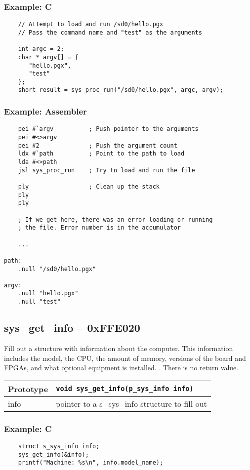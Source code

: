 \subsubsection*{Example: C}
\begin{lstlisting}
    // Attempt to load and run /sd0/hello.pgx
    // Pass the command name and "test" as the arguments

    int argc = 2;
    char * argv[] = {
       "hello.pgx",
       "test"
    };
    short result = sys_proc_run("/sd0/hello.pgx", argc, argv);
\end{lstlisting}

\subsubsection*{Example: Assembler}
\begin{verbatim}
    pei #`argv          ; Push pointer to the arguments
    pei #<>argv
    pei #2              ; Push the argument count
    ldx #`path          ; Point to the path to load
    lda #<>path
    jsl sys_proc_run    ; Try to load and run the file

    ply                 ; Clean up the stack
    ply
    ply

    ; If we get here, there was an error loading or running
    ; the file. Error number is in the accumulator

    ...

path:
    .null "/sd0/hello.pgx"

argv:
    .null "hello.pgx"
    .null "test"
\end{verbatim}


\subsection*{sys\_get\_info -- 0xFFE020}
Fill out a structure with information about the computer. This information includes the model, the CPU, the amount of memory, versions of the board and FPGAs, and what optional equipment is installed.
.
There is no return value.

\bigskip

\begin{tabular}{|l||l|} \hline
Prototype & \lstinline!void sys_get_info(p_sys_info info)! \\ \hline
info & pointer to a s\_sys\_info structure to fill out \\ \hline
\end{tabular}

\subsubsection*{Example: C}
\begin{lstlisting}
    struct s_sys_info info;
    sys_get_info(&info);
    printf("Machine: %s\n", info.model_name);	
\end{lstlisting}

